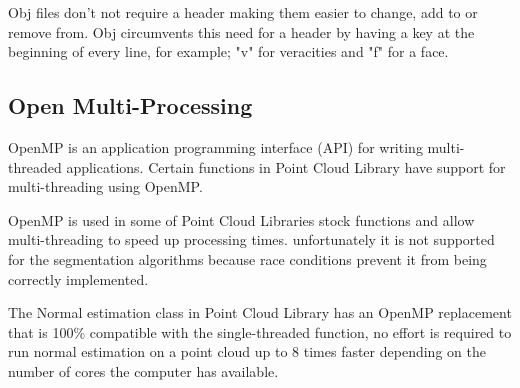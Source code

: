 			Obj files don't not require a header making them easier to change, add to or remove from. Obj circumvents this need for a header by having a key at the beginning of every line, for example; "v" for veracities and "f" for a face.
			 
			 
		
	
	\subsection{Open Multi-Processing}
		OpenMP is an application programming interface (API) for writing multi-threaded applications. Certain functions in Point Cloud Library have support for multi-threading using OpenMP.
		
		OpenMP is used in some of Point Cloud Libraries stock functions and allow multi-threading to speed up processing times. unfortunately it is not supported for the segmentation algorithms because race conditions prevent it from being correctly implemented. 
		
		The Normal estimation class in Point Cloud Library has an OpenMP replacement that is 100\% compatible with the single-threaded function, no effort is required to run normal estimation on a point cloud up to 8 times faster depending on the number of cores the computer has available.
	

	

	
